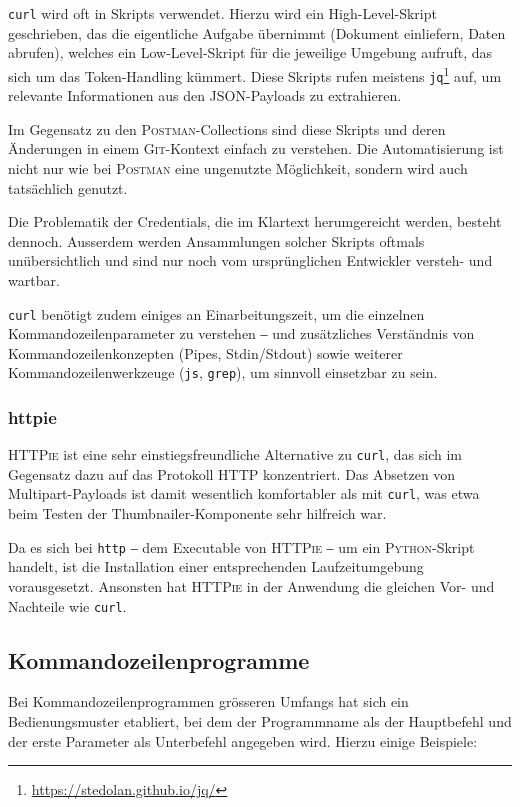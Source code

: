 \texttt{curl} wird oft in Skripts verwendet. Hierzu wird ein High-Level-Skript geschrieben, das die eigentliche Aufgabe übernimmt (Dokument einliefern, Daten abrufen), welches ein Low-Level-Skript für die jeweilige Umgebung aufruft, das sich um das Token-Handling kümmert. Diese Skripts rufen meistens \texttt{jq}\footnote{\url{https://stedolan.github.io/jq/}} auf, um relevante Informationen aus den JSON-Payloads zu extrahieren.

Im Gegensatz zu den \textsc{Postman}-Collections sind diese Skripts und deren Änderungen in einem \textsc{Git}-Kontext einfach zu verstehen. Die Automatisierung ist nicht nur wie bei \textsc{Postman} eine ungenutzte Möglichkeit, sondern wird auch tatsächlich genutzt.

Die Problematik der Credentials, die im Klartext herumgereicht werden, besteht dennoch. Ausserdem werden Ansammlungen solcher Skripts oftmals unübersichtlich und sind nur noch vom ursprünglichen Entwickler versteh- und wartbar.

\texttt{curl} benötigt zudem einiges an Einarbeitungszeit, um die einzelnen Kommandozeilenparameter zu verstehen ‒ und zusätzliches Verständnis von Kommandozeilenkonzepten (Pipes, Stdin/Stdout) sowie weiterer Kommandozeilenwerkzeuge (\texttt{js}, \texttt{grep}), um sinnvoll einsetzbar zu sein.

\subsubsection{httpie}

\textsc{HTTPie} ist eine sehr einstiegsfreundliche Alternative zu \texttt{curl}, das sich im Gegensatz dazu auf das Protokoll HTTP konzentriert. Das Absetzen von Multipart-Payloads ist damit wesentlich komfortabler als mit \texttt{curl}, was etwa beim Testen der Thumbnailer-Komponente sehr hilfreich war.

Da es sich bei \texttt{http} ‒ dem Executable von \textsc{HTTPie} ‒ um ein \textsc{Python}-Skript handelt, ist die Installation einer entsprechenden Laufzeitumgebung vorausgesetzt. Ansonsten hat \textsc{HTTPie} in der Anwendung die gleichen Vor- und Nachteile wie \texttt{curl}.

\subsection{Kommandozeilenprogramme}
\label{sec:Kommandozeilenprogramme}

Bei Kommandozeilenprogrammen grösseren Umfangs hat sich ein Bedienungsmuster etabliert, bei dem der Programmname als der Hauptbefehl und der erste Parameter als Unterbefehl angegeben wird. Hierzu einige Beispiele:

